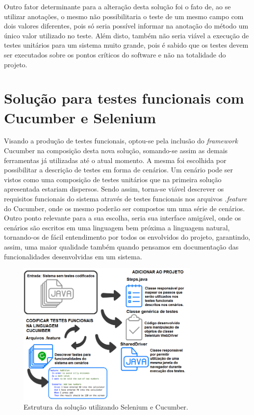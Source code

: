 \documentclass[tg]{mdtufsm}
\begin{document}
Outro fator determinante para a alteração desta solução foi o fato de, ao se utilizar anotações, o mesmo não possibilitaria o teste de um mesmo campo com dois valores diferentes, pois só seria possível informar na anotação do
método um único valor utilizado no teste. Além disto, também não seria viável a execução de testes unitários para um sistema muito grande, pois é sabido que os testes devem ser executados sobre os pontos críticos do software e não na totalidade do projeto.

\section{Solução para testes funcionais com Cucumber e Selenium}
Visando a produção de testes funcionais, optou-se pela inclusão do \emph{framework} Cucumber na composição desta nova solução, somando-se assim as demais ferramentas já utilizadas até o atual momento. A mesma foi escolhida por possibilitar a descrição de testes em forma de cenários. Um cenário pode ser vistos como uma composição de testes unitários que na primeira solução apresentada estariam dispersos. Sendo assim, torna-se viável descrever os requisitos funcionais do sistema através de testes funcionais nos arquivos \emph{.feature} do Cucumber, onde os mesmo poderão ser compostos um uma série de cenários. Outro ponto relevante para a sua escolha, seria sua interface amigável, onde os cenários são escritos em uma linguagem bem próxima a linguagem natural, tornando-os de fácil entendimento por todos os envolvidos do projeto, garantindo, assim, uma maior qualidade também quando pensamos em documentação das funcionalidades desenvolvidas em um sistema.

\begin{figure}[!htb]
	\centering
	\includegraphics[width=0.8\textwidth]{solucao2}
	\caption{Estrutura da solução utilizando Selenium e Cucumber.}
	\label{fig:solucao2}
\end{figure}
\end{document}
